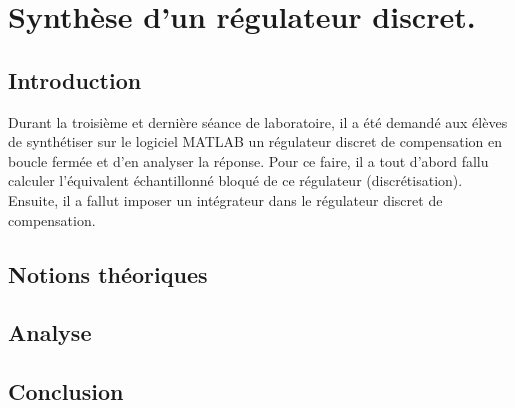 \chapter{Synthèse d'un régulateur discret.}

\section{Introduction}
Durant la troisième et dernière séance de laboratoire, il a été demandé aux élèves de synthétiser sur le logiciel MATLAB un régulateur discret de compensation en boucle fermée et d'en analyser la réponse. Pour ce faire, il a tout d'abord fallu calculer l'équivalent échantillonné bloqué de ce régulateur (discrétisation). Ensuite, il a fallut imposer un intégrateur dans le régulateur discret de compensation.

\section{Notions théoriques}


\section{Analyse}


\section{Conclusion}

